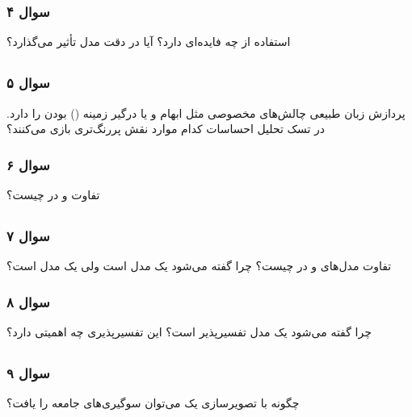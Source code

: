 \documentclass[12pt]{article}
\begin{document}
	\subsubsection*{سوال ۴}
	استفاده از 
	چه فایده‌ای دارد؟ آیا در دقت مدل تأثیر می‌گذارد؟
	
	\subsection{}
	\subsubsection*{سوال ۵}
	پردازش زبان طبیعی چالش‌های مخصوصی مثل ابهام و یا درگیر زمینه () بودن را دارد. در تسک تحلیل احساسات کدام موارد نقش پررنگ‌تری بازی می‌کنند؟
	
	\subsubsection*{سوال ۶}
	تفاوت 
	و 
	در چیست؟
	
	\subsection{}
	\subsubsection*{سوال ۷}
	تفاوت مدل‌های 
	و 
	در چیست؟ چرا گفته می‌شود 
	یک مدل 
	است ولی 
	یک مدل 
	است؟
	
	\subsubsection*{سوال ۸}
	چرا گفته می‌شود 
	یک مدل تفسیرپذیر است؟ این تفسیرپذیری چه اهمیتی دارد؟
	
	\subsection{}
	\subsubsection*{سوال ۹}
	چگونه با تصویرسازی
	یک 
	می‌توان سوگیری‌های
	جامعه را یافت؟
	
\end{document}
